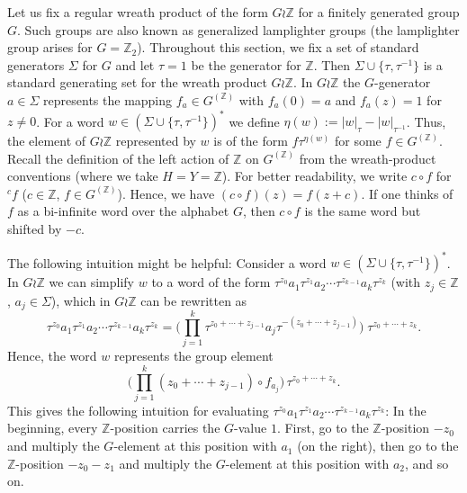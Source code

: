 \documentclass[10pt,a4paper]{article}
\newcommand{\Z}{\ensuremath{\mathbb Z}}
\begin{document}
Let us fix a regular wreath product of the form $G \wr \mathbb{Z}$ for a finitely generated
group $G$. Such groups are also known as generalized lamplighter groups (the lamplighter group arises
for $G = \mathbb{Z}_2$). Throughout this section, we fix a set of standard generators $\Sigma$ for $G$ and let $\tau = 1$ be the generator for $\mathbb{Z}$. 
Then $\Sigma \cup \{\tau,\tau^{-1}\}$ is a standard generating set for the wreath product $G \wr \mathbb{Z}$.
In $G \wr \mathbb{Z}$ the $G$-generator $a \in \Sigma$ represents the mapping $f_{a} \in G^{(\Z)}$ with $f_{a}(0) = a$ and 
$f_{a}(z) = 1$ for $z \neq 0$. 
For a word $w \in (\Sigma \cup \{\tau,\tau^{-1}\})^*$ we define $\eta(w) :=  |w|_\tau-|w|_{\tau^{-1}}$. Thus, the element of $G \wr \mathbb{Z}$ represented by
$w$ is of the form $f  \tau^{\eta(w)}$ for some $f \in G^{(\Z)}$.
Recall the definition of the left action of $\Z$ on $G^{(\Z)}$ from the wreath-product conventions (where we take $H = Y = \Z$).
For better readability, we write $c \circ f$ for ${}^c \! f$ ($c \in \Z$, $f \in G^{(\Z)}$).
Hence, we have $(c \circ f)(z) = f(z+c)$. If one thinks of $f$ as a bi-infinite word over the alphabet $G$,
then $c \circ f$ is the same word but shifted by $-c$.

The following intuition might be helpful: Consider a word $w \in ( \Sigma \cup \{\tau, \tau^{-1} \})^*$. In 
$G \wr \mathbb{Z}$ we can simplify $w$ to a word of the form
$\tau^{z_0} a_{1} \tau^{z_1} a_{2} \cdots \tau^{z_{k-1}} a_{k} \tau^{z_k}$ (with $z_j \in \Z$, $a_j \in \Sigma$),
which in $G \wr \mathbb{Z}$ can be rewritten
as
\[
\tau^{z_0} a_{1} \tau^{z_1} a_{2} \cdots \tau^{z_{k-1}} a_{k} \tau^{z_k} = \big(\prod_{j=1}^k \tau^{z_0 + \cdots+ z_{j-1}} a_{j} \tau^{-(z_0 + \cdots +z_{j-1})}\big) \; \tau^{z_0 + \cdots +z_k}.
\]  
Hence, the word $w$ represents the group element 
\[
\big(\prod_{j=1}^k (z_0 + \cdots+ z_{j-1}) \circ f_{a_j} \big)\, \tau^{z_0 + \cdots +z_k} .
\]
This gives the following intuition for evaluating $\tau^{z_0} a_{1} \tau^{z_1} a_{2} \cdots \tau^{z_{k-1}} a_{k} \tau^{z_k}$:
In the beginning, every $\Z$-position carries the $G$-value $1$. First, 
go to the $\Z$-position $-z_0$ and multiply the $G$-element at this position with $a_1$ (on the right), then 
go to the $\Z$-position $-z_0-z_1$ and multiply the $G$-element at this position with $a_2$, and so on.  
\end{document}
